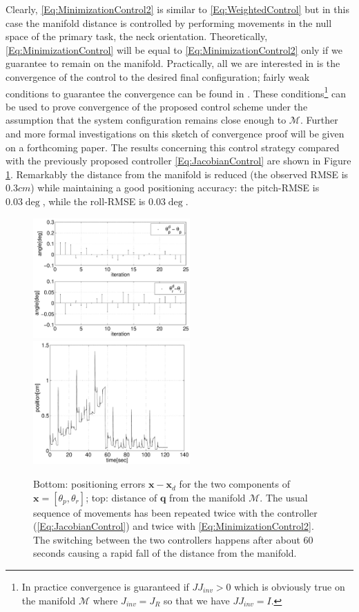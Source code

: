 \documentclass[conference]{IEEEtran}
\numberwithin{equation}{section}
\newcommand{\q}{\mathbf{q}}
\newcommand{\x}{\mathbf{x}}
\begin{document}
Clearly, \eqref{Eq:MinimizationControl2} is similar to \eqref{Eq:WeightedControl} but in this case the manifold distance is controlled by performing movements in the null space of the primary task, the neck orientation. Theoretically, \eqref{Eq:MinimizationControl} will be equal to \eqref{Eq:MinimizationControl2} only if we guarantee to remain on the manifold. Practically, all we are interested in is the convergence of the control to the desired final configuration; fairly weak conditions to guarantee the convergence can be found in \cite{SamsonEspiau}. These conditions\footnote{In practice convergence is guaranteed if $J J_{inv} >0$ which is obviously true on the manifold $\mathcal M$ where $J_{inv} = J_R$ so that we have $J J_{inv} = I$.} can be used to prove convergence of the proposed control scheme under the assumption that the system configuration remains close enough to $\mathcal M$. Further and more formal investigations on this sketch of convergence proof will be given on a forthcoming paper. The results concerning this control strategy compared with the previously proposed controller \eqref{Eq:JacobianControl} are shown in Figure \ref{Fig:ManifoldDistanceJacobianAndMinimization}. Remarkably the distance from the manifold is reduced (the observed RMSE is $0.3cm$) while maintaining a good positioning accuracy: the pitch-RMSE is $0.03 \deg$, while the roll-RMSE is $0.03 \deg$.

\begin{figure}[tbp]
\centering 
\includegraphics[width=60mm]{image/JacobianVSMinimizationErrors.pdf} 
\includegraphics[width=60mm]{image/JacobianVSMinimizationDistance.pdf} 
\caption{Bottom: positioning errors $\x - \x_d$ for the two components of $\x = [\theta_p, \theta_r]$; top: distance of $\q$ from the manifold $\mathcal M$. The usual sequence of movements has been repeated twice with the controller (\ref{Eq:JacobianControl}) and twice with \eqref{Eq:MinimizationControl2}. The switching between the two controllers happens after about 60 seconds causing a rapid fall of the distance from the manifold.} 
\label{Fig:ManifoldDistanceJacobianAndMinimization}
\end{figure}
\end{document}
